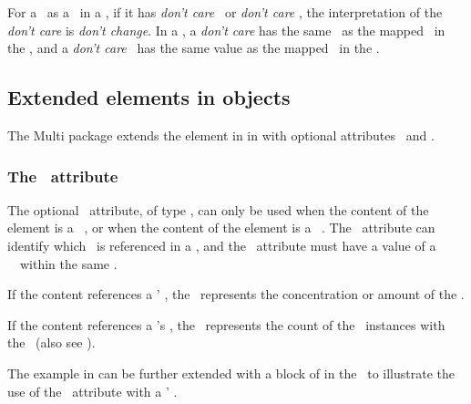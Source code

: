 For a \species\ as a \product\ in a \reaction, if it has \emph{don't care} \outwardBindingSites\ or \emph{don't care} , the interpretation of the \emph{don't care} is \emph{don't change}. In a \product, a \emph{don't care}  has the same \bindingStatusAtt\ as the mapped \outwardBindingSite\ in the \reactant, and a \emph{don't care} \speciesFeature\ has the same value as the mapped \speciesFeature\ in the \reactant.


\subsection{Extended  elements in  objects}
\label{def:Reaction:Math:ci}

The Multi package extends the  element in  in \ExReaction with optional attributes \speciesReferenceAtt\ and \representationTypeAtt.

\subsubsection{The \speciesReferenceAtt\ attribute}
\label{def:Reaction:Math:ci:speciesReference}

The optional \speciesReferenceAtt\ attribute, of type \SIdRefPT, can only be used when the content of the  element is a \species\ \idAtt, or when the content of the  element is a \speciesFeature\ \idAtt. The \speciesReferenceAtt\ attribute can identify which \species\ is referenced in a \reaction, and the \speciesReferenceAtt\ attribute must have a value of a \speciesReference\ \idAtt\ within the same \reaction. 

If the  content references a \species' \idAtt, the \idAtt\ represents the concentration or amount of the \species. 

If the  content references a \speciesFeature's \idAtt, the \idAtt\ represents the count of the \speciesFeature\ instances with the \speciesFeatureValue\ (also see ).  


The example in  can be further extended with a block of  in the \reaction\ to illustrate the use of the \speciesReferenceAtt\ attribute with a \species' \idAtt.


